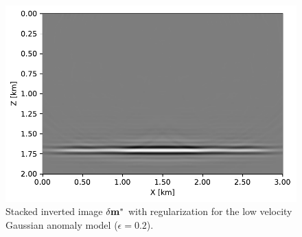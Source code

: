 \begin{figure}[h]
\centering
\includegraphics[width=0.7\linewidth]{Fig/anomaly-inverted-image-stack-reg.pdf}

\vspace*{-0.5cm}
\caption{Stacked inverted image $\delta \mathbf{m}^{\ast}$ with regularization  for the low velocity Gaussian anomaly model ($\epsilon = 0.2$).}
\label{fig:example1_stack_reg}
\end{figure}